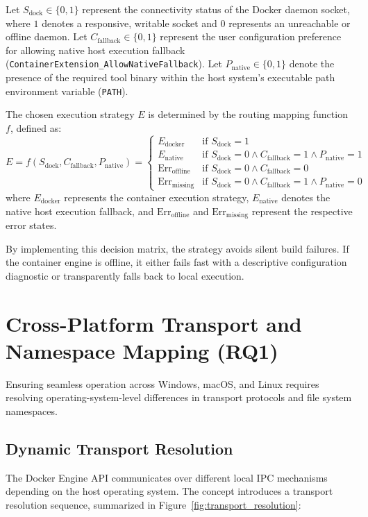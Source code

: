 Let $S_{\text{dock}} \in \{0, 1\}$ represent the connectivity status of the Docker daemon socket, where $1$ denotes a responsive, writable socket and $0$ represents an unreachable or offline daemon. Let $C_{\text{fallback}} \in \{0, 1\}$ represent the user configuration preference for allowing native host execution fallback (\texttt{ContainerExtension\_AllowNativeFallback}). Let $P_{\text{native}} \in \{0, 1\}$ denote the presence of the required tool binary within the host system's executable path environment variable (\texttt{PATH}).

The chosen execution strategy $E$ is determined by the routing mapping function $f$, defined as:
\begin{equation}
E = f(S_{\text{dock}}, C_{\text{fallback}}, P_{\text{native}}) = \begin{cases} 
E_{\text{docker}} & \text{if } S_{\text{dock}} = 1 \\
E_{\text{native}} & \text{if } S_{\text{dock}} = 0 \land C_{\text{fallback}} = 1 \land P_{\text{native}} = 1 \\
\text{Err}_{\text{offline}} & \text{if } S_{\text{dock}} = 0 \land C_{\text{fallback}} = 0 \\
\text{Err}_{\text{missing}} & \text{if } S_{\text{dock}} = 0 \land C_{\text{fallback}} = 1 \land P_{\text{native}} = 0 
\end{cases}
\end{equation}
where $E_{\text{docker}}$ represents the container execution strategy, $E_{\text{native}}$ denotes the native host execution fallback, and $\text{Err}_{\text{offline}}$ and $\text{Err}_{\text{missing}}$ represent the respective error states.

By implementing this decision matrix, the strategy avoids silent build failures. If the container engine is offline, it either fails fast with a descriptive configuration diagnostic or transparently falls back to local execution.

\section[Cross-Platform Transport and Namespace Mapping (RQ1)]{Cross-Platform Transport and\\ Namespace Mapping (RQ1)}
Ensuring seamless operation across Windows, macOS, and Linux requires resolving operating-system-level differences in transport protocols and file system namespaces.

\subsection{Dynamic Transport Resolution}
The Docker Engine API communicates over different local IPC mechanisms depending on the host operating system. The concept introduces a transport resolution sequence, summarized in Figure~\ref{fig:transport_resolution}:

